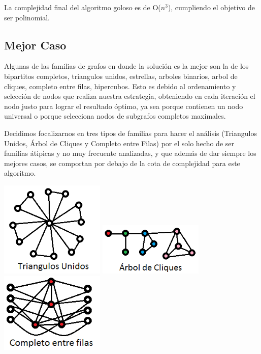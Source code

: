 La complejidad final del algoritmo goloso es de O($n^3$), cumpliendo el objetivo de ser polinomial.

\subsection{Mejor Caso}

Algunas de las familias de grafos en donde la solución es la mejor son la de los bipartitos completos, triangulos unidos, estrellas, arboles binarios, arbol de cliques, completo entre filas, hipercubos. Esto es debido al ordenamiento y selección de nodos que realiza nuestra estrategia, obteniendo en cada iteración el nodo justo para lograr el resultado óptimo, ya sea porque contienen un nodo universal o porque selecciona nodos de subgrafos completos maximales.

Decidimos focalizarnos en tres tipos de familias para hacer el análisis (Triangulos Unidos, Árbol de Cliques y Completo entre Filas) por el solo hecho de ser familias átipicas y no muy frecuente analizadas, y que además de dar siempre los mejores casos, se comportan por debajo de la cota de complejidad para este algoritmo.

\includegraphics[width=5cm]{./graficos/triangulosunidos.png}
\includegraphics[width=5cm]{./graficos/cliquetree.png}
\includegraphics[width=5cm]{./graficos/completoentrefilas.png}

